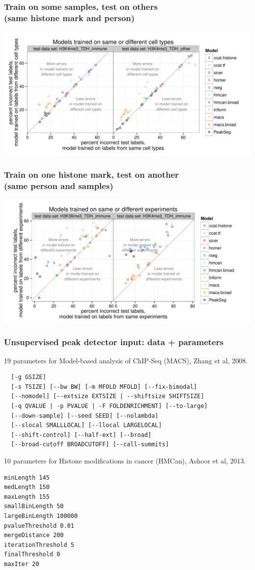 \documentclass{beamer}
\begin{document}
\begin{frame}
  \frametitle{Train on some samples, test on others\\
(same histone mark and person)}
  \includegraphics[width=1.1\textwidth]{figure-test-H3K4me3-types.pdf}
\end{frame}

\begin{frame}
  \frametitle{Train on one histone mark, test on another\\
(same person and samples)}
  \includegraphics[width=1.1\textwidth]{figure-test-TDH-experiments.pdf}
\end{frame}


\begin{frame}[fragile]
  \frametitle{Unsupervised peak detector input: data + parameters}
\scriptsize
19 parameters for Model-based analysis of ChIP-Seq (MACS), Zhang et al, 2008.
\begin{verbatim}
  [-g GSIZE]
  [-s TSIZE] [--bw BW] [-m MFOLD MFOLD] [--fix-bimodal]
  [--nomodel] [--extsize EXTSIZE | --shiftsize SHIFTSIZE]
  [-q QVALUE | -p PVALUE | -F FOLDENRICHMENT] [--to-large]
  [--down-sample] [--seed SEED] [--nolambda]
  [--slocal SMALLLOCAL] [--llocal LARGELOCAL]
  [--shift-control] [--half-ext] [--broad]
  [--broad-cutoff BROADCUTOFF] [--call-summits]
\end{verbatim}
10 parameters for Histone modifications in cancer (HMCan),
Ashoor et al, 2013.
\begin{verbatim}
minLength 145
medLength 150
maxLength 155
smallBinLength 50
largeBinLength 100000
pvalueThreshold 0.01
mergeDistance 200
iterationThreshold 5
finalThreshold 0
maxIter 20
\end{verbatim}
\end{frame}
\end{document}
